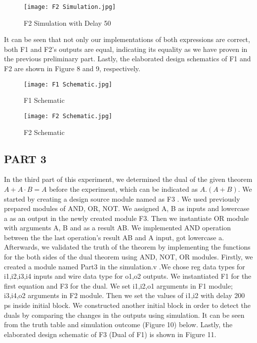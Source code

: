 \documentclass[pdftex,12pt,a4paper]{article}
\begin{document}
\begin{figure}[ht]
	\centering
	\texttt{[image: F2 Simulation.jpg]}	
	\caption{F2 Simulation with Delay 50}
	\label{fig1}
\end{figure}
It can be seen that not only our implementations of both expressions are correct, both F1 and F2's outputs are equal, indicating its equality as we have proven in the previous preliminary part. Lastly, the elaborated design schematics of F1 and F2 are shown in Figure 8 and 9, respectively. 

\begin{figure}[ht]
	\centering
	\texttt{[image: F1 Schematic.jpg]}	
	\caption{F1 Schematic}
	\label{fig1}
\end{figure}

\begin{figure}[ht]
	\centering
	\texttt{[image: F2 Schematic.jpg]}	
	\caption{F2 Schematic}
	\label{fig1}
\end{figure}
\newpage
\subsection{PART 3}
In the third part of this experiment, we determined the dual of the given theorem \(A + A · B = A\) before the experiment, which can be indicated as \( A . (A + B) \). We started by creating a design source module named as F3 . We used previously prepared modules of AND, OR, NOT. We assigned A, B as inputs and lowercase a as an output in the newly created module F3. Then we instantiate OR module with arguments A, B and as a result AB. We implemented AND operation between the the last operation's result AB and A input, got lowercase a. 
Afterwards, we validated the truth of the theorem by implementing the functions for the both sides of the dual theorem using AND, NOT, OR modules.
Firstly, we created a module named Part3 in the simulation.v .We chose reg data types for i1,i2,i3,i4 inputs and wire data type for o1,o2 outputs. We 
instantiated F1 for the first equation and F3 for the dual. We set i1,i2,o1 arguments in F1 module; i3,i4,o2 arguments in F2 module. Then we set the values of i1,i2 with delay 200 ps inside initial block. We constructed another initial block in order to detect the duals by comparing the changes in the outputs using simulation. It can be seen from the truth table and simulation outcome  (Figure 10) below. Lastly, the elaborated design schematic of F3 (Dual of F1) is shown in Figure 11.
\end{document}
